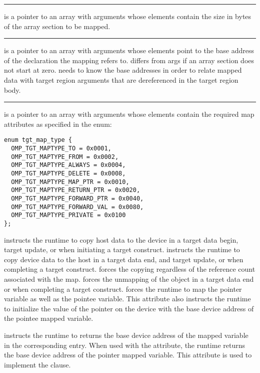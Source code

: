 \noindent\rule{\textwidth}{0.4pt}

 is a pointer to an array with  arguments whose elements contain the size in bytes of the array section to be mapped.

\noindent\rule{\textwidth}{0.4pt}

 is a pointer to an array with  arguments whose elements point to the base address of the declaration the mapping refers to.  differs from args if an array section does not start at zero. \libomptarget{} needs to know the base addresses in order to relate mapped data with target region arguments that are dereferenced in the target region body.

\noindent\rule{\textwidth}{0.4pt}

 is a pointer to an array with  arguments whose elements contain the required map attributes as specified in the enum:
\begin{lstlisting}
enum tgt_map_type {
  OMP_TGT_MAPTYPE_TO = 0x0001,
  OMP_TGT_MAPTYPE_FROM = 0x0002,
  OMP_TGT_MAPTYPE_ALWAYS = 0x0004,
  OMP_TGT_MAPTYPE_DELETE = 0x0008,
  OMP_TGT_MAPTYPE_MAP_PTR = 0x0010,
  OMP_TGT_MAPTYPE_RETURN_PTR = 0x0020,
  OMP_TGT_MAPTYPE_FORWARD_PTR = 0x0040,
  OMP_TGT_MAPTYPE_FORWARD_VAL = 0x0080,
  OMP_TGT_MAPTYPE_PRIVATE = 0x0100
};
\end{lstlisting}

\sloppy
{} instructs the runtime to copy  host data to the device in a target data begin, target update, or when initiating a target construct.   instructs the runtime to copy  device data to the host in a target data end, and target update, or when completing a target construct.   forces the copying regardless of the reference count associated with the map.    forces the unmapping of the object in a target data end or when completing a target construct.  forces the runtime to map the pointer variable as well as the pointee variable. This attribute also instructs the runtime to initialize the value of the pointer on the device with the base device address of the pointee mapped variable. 

 instructs the runtime to returns the base device address of the mapped variable in the corresponding  entry. When used with  the  attribute, the runtime returns the base device address of the pointer mapped variable. This attribute is used to implement the  clause.

